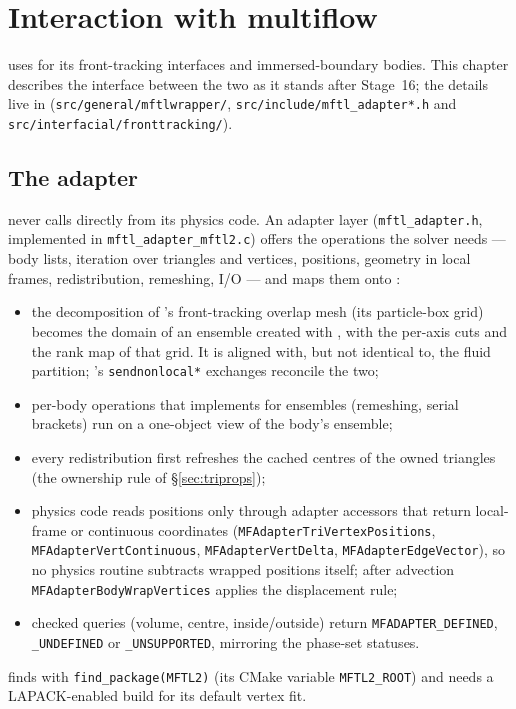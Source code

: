 \chapter{Interaction with multiflow}
\label{ch:multiflow}

\multi{} uses \mftl{} for its front-tracking interfaces and immersed-boundary bodies. This
chapter describes the interface between the two as it stands after Stage~16; the details live in
\multi{} (\texttt{src/general/mftlwrapper/}, \texttt{src/include/mftl\_adapter*.h} and
\texttt{src/interfacial/fronttracking/}).

\section{The adapter}

\multi{} never calls \mftl{} directly from its physics code. An adapter layer
(\texttt{mftl\_adapter.h}, implemented in \texttt{mftl\_adapter\_mftl2.c}) offers the operations
the solver needs --- body lists, iteration over triangles and vertices, positions, geometry in
local frames, redistribution, remeshing, I/O --- and maps them onto \mftl:
\begin{itemize}
  \item the decomposition of \multi's front-tracking overlap mesh (its particle-box grid)
    becomes the domain of an ensemble created with , with the
    per-axis cuts and the rank map of that grid. It is aligned with, but not identical to, the
    fluid partition; \multi's \texttt{sendnonlocal*} exchanges reconcile the two;
  \item per-body operations that \mftl{} implements for ensembles (remeshing, serial brackets)
    run on a one-object view of the body's ensemble;
  \item every redistribution first refreshes the cached centres of the owned triangles (the
    ownership rule of \S\ref{sec:triprops});
  \item physics code reads positions only through adapter accessors that return local-frame or
    continuous coordinates (\texttt{MFAdapterTriVertexPositions}, \texttt{MFAdapterVertContinuous},
    \texttt{MFAdapterVertDelta}, \texttt{MFAdapterEdgeVector}), so no physics routine subtracts
    wrapped positions itself; after advection \texttt{MFAdapterBodyWrapVertices} applies the
    displacement rule;
  \item checked queries (volume, centre, inside/outside) return
    \texttt{MFADAPTER\_DEFINED}, \texttt{\_UNDEFINED} or \texttt{\_UNSUPPORTED}, mirroring the
    phase-set statuses.
\end{itemize}
\multi{} finds \mftl{} with \texttt{find\_package(MFTL2)} (its CMake variable \texttt{MFTL2\_ROOT})
and needs a LAPACK-enabled build for its default vertex fit.

